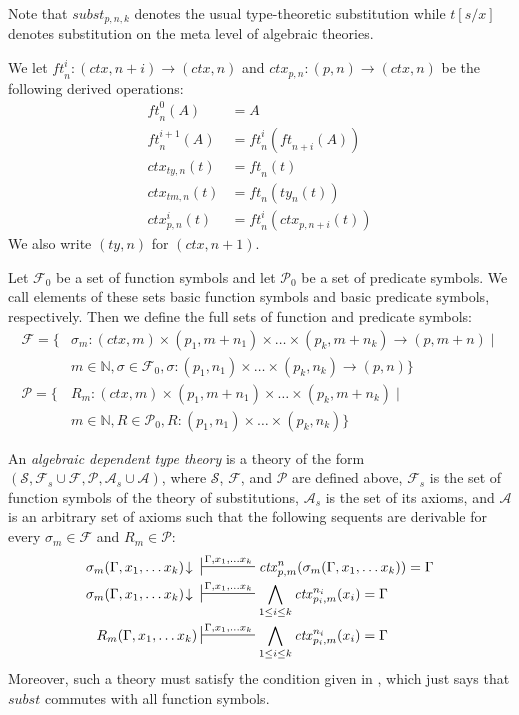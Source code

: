 \documentclass[reqno]{amsart}
\theoremstyle{definition}
\theoremstyle{remark}
\newcommand{\subst}{\mathit{subst}}
\newcommand{\ft}{\mathit{ft}}
\newcommand{\ty}{\mathit{ty}}
\newcommand{\ctx}{\mathit{ctx}}
\newcommand{\tm}{\mathit{tm}}
\numberwithin{figure}{section}
\begin{document}
Note that $\subst_{p,n,k}$ denotes the usual type-theoretic substitution while $t[s/x]$ denotes substitution on the meta level of algebraic theories.

We let $\ft^i_n : (\ctx,n+i) \to (\ctx,n)$ and $\ctx_{p,n} : (p,n) \to (\ctx,n)$ be the following derived operations:
\begin{align*}
\ft^0_n(A)      & = A \\
\ft^{i+1}_n(A)  & = \ft^i_n(\ft_{n+i}(A)) \\
\ctx_{\ty,n}(t) & = \ft_n(t) \\
\ctx_{\tm,n}(t) & = \ft_n(\ty_n(t)) \\
\ctx^i_{p,n}(t) & = \ft^i_n(\ctx_{p,n+i}(t))
\end{align*}
We also write $(\ty,n)$ for $(\ctx,n+1)$.

Let $\mathcal{F}_0$ be a set of function symbols and let $\mathcal{P}_0$ be a set of predicate symbols.
We call elements of these sets basic function symbols and basic predicate symbols, respectively.
Then we define the full sets of function and predicate symbols:
\begin{align*}
\mathcal{F} = \{ & \sigma_m : (\ctx,m) \times (p_1,m+n_1) \times \ldots \times (p_k,m+n_k) \to (p,m+n) \mid \\
                 & m \in \mathbb{N}, \sigma \in \mathcal{F}_0, \sigma : (p_1,n_1) \times \ldots \times (p_k,n_k) \to (p,n) \} \\
\mathcal{P} = \{ & R_m : (\ctx,m) \times (p_1,m+n_1) \times \ldots \times (p_k,m+n_k) \mid \\
                 & m \in \mathbb{N}, R \in \mathcal{P}_0, R : (p_1,n_1) \times \ldots \times (p_k,n_k) \}
\end{align*}

An \emph{algebraic dependent type theory} is a theory of the form $(\mathcal{S}, \mathcal{F}_s \cup \mathcal{F}, \mathcal{P}, \mathcal{A}_s \cup \mathcal{A})$, where $\mathcal{S}$, $\mathcal{F}$, and $\mathcal{P}$ are defined above,
$\mathcal{F}_s$ is the set of function symbols of the theory of substitutions, $\mathcal{A}_s$ is the set of its axioms, and $\mathcal{A}$ is an arbitrary set of axioms such that the following sequents are derivable for every $\sigma_m \in \mathcal{F}$ and $R_m \in \mathcal{P}$:
\begin{align*}
\sigma_m(\Gamma, x_1, \ldots x_k)\!\downarrow\ & \sststile{}{\Gamma, x_1, \ldots x_k} \ctx^n_{p,m}(\sigma_m(\Gamma, x_1, \ldots x_k)) = \Gamma \\
\sigma_m(\Gamma, x_1, \ldots x_k)\!\downarrow\ & \sststile{}{\Gamma, x_1, \ldots x_k} \bigwedge_{1 \leq i \leq k} \ctx^{n_i}_{p_i,m}(x_i) = \Gamma \\
R_m(\Gamma, x_1, \ldots x_k) & \sststile{}{\Gamma, x_1, \ldots x_k} \bigwedge_{1 \leq i \leq k} \ctx^{n_i}_{p_i,m}(x_i) = \Gamma
\end{align*}
Moreover, such a theory must satisfy the condition given in \cite[Definition~4.5]{alg-tt}, which just says that $\subst$ commutes with all function symbols.
\end{document}
